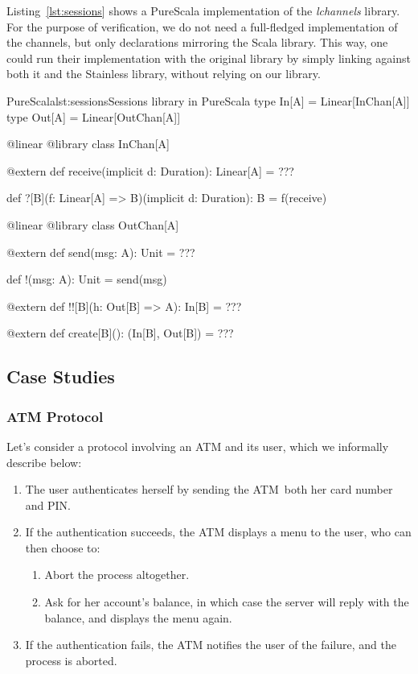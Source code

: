 \documentclass[a4paper,twoside]{article}
\newcommand{\RefCode}[1]{Listing~\ref{#1}}
\begin{document}
\RefCode{lst:sessions} shows a PureScala implementation of the \textit{lchannels} library. For the purpose of verification, we do not need a full-fledged implementation of the channels, but only declarations mirroring the Scala library. This way, one could run their implementation with the original library by simply linking against both it and the Stainless library, without relying on our library.

\begin{Code}{PureScala}{lst:sessions}{Sessions library in PureScala}
type In[A]  = Linear[InChan[A]]
type Out[A] = Linear[OutChan[A]]

@linear @library
class InChan[A] {

  @extern
  def receive(implicit d: Duration): Linear[A] = {
    ???
  }

  def ?[B](f: Linear[A] => B)(implicit d: Duration): B = {
    f(receive)
  }
}

@linear @library
class OutChan[A] {

  @extern
  def send(msg: A): Unit = {
    ???
  }

  def !(msg: A): Unit = {
    send(msg)
  }

  @extern
  def !![B](h: Out[B] => A): In[B] = {
    ???
  }

  @extern
  def create[B](): (In[B], Out[B]) = {
    ???
  }
}
\end{Code}

\subsection{Case Studies}

\subsubsection{ATM Protocol}

Let's consider a protocol involving an ATM and its user, which we informally describe below:

\begin{enumerate}[label=\Alph*]
\item The user authenticates herself by sending the ATM both her card number and PIN.
\item If the authentication succeeds, the ATM displays a menu to the user, who can then choose to:
\begin{enumerate}
\item Abort the process altogether.
\item Ask for her account's balance, in which case the server will reply with the balance, and displays the menu again.
\end{enumerate}
\item If the authentication fails, the ATM notifies the user of the failure, and the process is aborted.
\end{enumerate}
\end{document}
